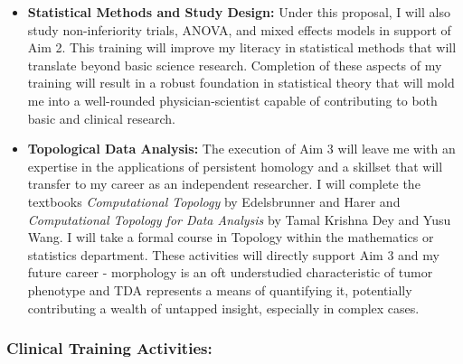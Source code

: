 \documentclass{NIHGrant}
\begin{document}
\begin{itemize}[leftmargin=*, nosep]
  \item \textbf{Statistical Methods and Study Design:} Under this proposal, I will also study non-inferiority trials, ANOVA, and mixed effects models in support of Aim 2. This training will improve my literacy in statistical methods that will translate beyond basic science research. Completion of these aspects of my training will result in a robust foundation in statistical theory that will mold me into a well-rounded physician-scientist capable of contributing to both basic and clinical research.
  \item \textbf{Topological Data Analysis:} The execution of Aim 3 will leave me with an expertise in the applications of persistent homology and a skillset that will transfer to my career as an independent researcher. I will complete the textbooks \textit{Computational Topology} by Edelsbrunner and Harer and \textit{Computational Topology for Data Analysis} by Tamal Krishna Dey and Yusu Wang. I will take a formal course in Topology within the mathematics or statistics department. These activities will directly support Aim 3 and my future career - morphology is an oft understudied characteristic of tumor phenotype and TDA represents a means of quantifying it, potentially contributing a wealth of untapped insight, especially in complex cases.
\end{itemize}

\subsubsection*{Clinical Training Activities:}
\end{document}
